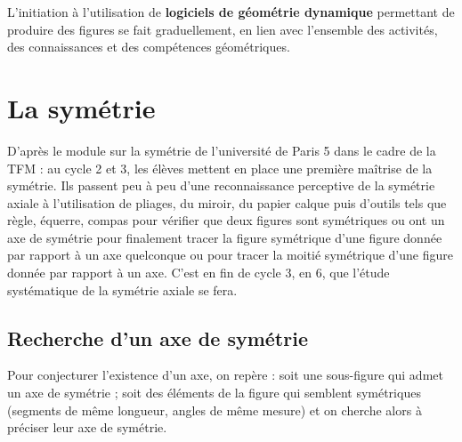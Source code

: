 L’initiation à l’utilisation de {\bf logiciels de géométrie dynamique} permettant de produire des figures se fait graduellement, en lien avec l’ensemble des activités, des connaissances et des compétences géométriques. 


\section{La symétrie} 

D'après le \og module sur la symétrie de l'université de Paris 5 dans le cadre de la TFM \fg{} : au cycle 2 et 3, les élèves mettent en place une première maîtrise de la symétrie. Ils passent peu à peu d’une reconnaissance perceptive de la symétrie axiale à l'utilisation de pliages, du miroir, du papier calque puis d’outils tels que règle, équerre, compas pour vérifier que deux figures sont symétriques ou ont un axe de symétrie pour finalement tracer la figure symétrique d’une figure donnée par rapport à un axe quelconque ou pour tracer la moitié symétrique d’une figure donnée par rapport à un axe. C'est en fin de cycle 3, en 6, que l’étude systématique de la symétrie axiale se fera.


\subsection{Recherche d'un axe de symétrie} %


Pour conjecturer l'existence d'un axe, on repère : soit une sous-figure qui admet un axe de symétrie ; soit des éléments de la figure qui semblent symétriques (segments de même longueur, angles de même mesure) et on cherche alors à préciser leur axe de symétrie.


